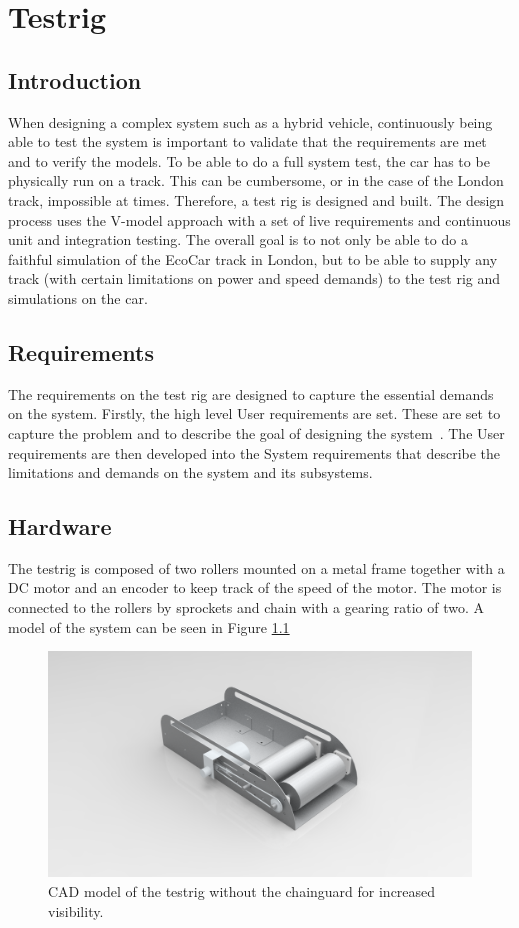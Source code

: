 \chapter{Testrig}
\section{Introduction}
When designing a complex system such as a hybrid vehicle, continuously being
able to test the system is important to validate that the requirements are met
and to verify the models. To be able to do a full system test, the car has to be
physically run on a track. This can be cumbersome, or in the case of the London
track, impossible at times. Therefore, a test rig is designed and built. The
design process uses the V-model approach with a set of live requirements and
continuous unit and integration testing. The overall goal is to not only be able
to do a faithful simulation of the EcoCar track in London, but to be able to
supply any track (with certain limitations on power and speed demands) to the
test rig and simulations on the car.

\section{Requirements}
The requirements on the test rig are designed to capture the essential demands
on the system. Firstly, the high level User requirements are set. These are set
to capture the problem and to describe the goal of designing the
system~\cite{ibm_req}. The User requirements are then developed into the System
requirements that describe the limitations and demands on the system and its
subsystems.

\section{Hardware}
The testrig is composed of two rollers mounted on a metal frame together with a
DC motor and an encoder to keep track of the speed
of the motor. The motor is connected to the rollers by sprockets and chain with
a gearing ratio of two. A model of the system can be seen in Figure \ref{fig:testrig_hardware}

\begin{figure}[H]
    \centering
    \includegraphics[width=\textwidth]{./img/testrig_hardware.png}
    \caption{CAD model of the testrig without the chainguard for increased visibility.}
    \label{fig:testrig_hardware}
\end{figure}

